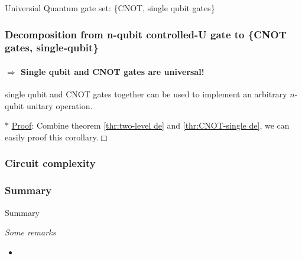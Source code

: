 \documentclass[9pt]{beamer}
\begin{document}
\begin{section}{Universial Quantum gate set: \{CNOT, single qubit gates\}}
        \begin{frame}
            \frametitle{Decomposition from n-qubit controlled-U gate to \{CNOT gates, single-qubit\}}
            \framesubtitle{$\Rightarrow$ Single qubit and CNOT gates are universal!}
            \begin{corollary}\label{col:universial-ver1}
                single qubit and CNOT gates together can be used to implement an \alert{arbitrary $n$-qubit unitary operation}.
            \end{corollary}
            $\ast$ \underline{Proof}: Combine theorem \ref{thr:two-level de} and \ref{thr:CNOT-single de}, we can easily proof this corollary.$\Box$
        \end{frame}

        \begin{frame}
            \frametitle{Circuit complexity}
        
            
        
        \end{frame}

        \begin{frame}
            \frametitle{Summary}
            \begin{block}{Summary}
                
            \end{block}
            \vspace{0.2cm}
            \textit{Some remarks}
            \begin{itemize}
                \item 
            \end{itemize}
        
        \end{frame}
    \end{section}
    
\end{document}
